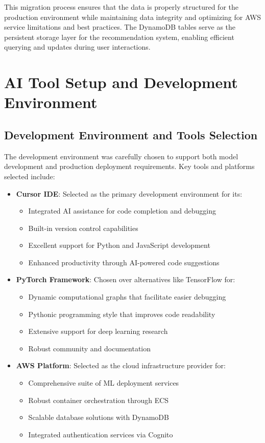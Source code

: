 \documentclass[12pt]{article}
\begin{document}
This migration process ensures that the data is properly structured for the production environment while maintaining data integrity and optimizing for AWS service limitations and best practices. The DynamoDB tables serve as the persistent storage layer for the recommendation system, enabling efficient querying and updates during user interactions.

\section{AI Tool Setup and Development Environment}

\subsection{Development Environment and Tools Selection}
The development environment was carefully chosen to support both model development and production deployment requirements. Key tools and platforms selected include:

\begin{itemize}
    \item \textbf{Cursor IDE}: Selected as the primary development environment for its:
    \begin{itemize}
        \item Integrated AI assistance for code completion and debugging
        \item Built-in version control capabilities
        \item Excellent support for Python and JavaScript development
        \item Enhanced productivity through AI-powered code suggestions
    \end{itemize}
    
    \item \textbf{PyTorch Framework}: Chosen over alternatives like TensorFlow for:
    \begin{itemize}
        \item Dynamic computational graphs that facilitate easier debugging
        \item Pythonic programming style that improves code readability
        \item Extensive support for deep learning research
        \item Robust community and documentation
    \end{itemize}
    
    \item \textbf{AWS Platform}: Selected as the cloud infrastructure provider for:
    \begin{itemize}
        \item Comprehensive suite of ML deployment services
        \item Robust container orchestration through ECS
        \item Scalable database solutions with DynamoDB
        \item Integrated authentication services via Cognito
    \end{itemize}
\end{itemize}
\end{document}
